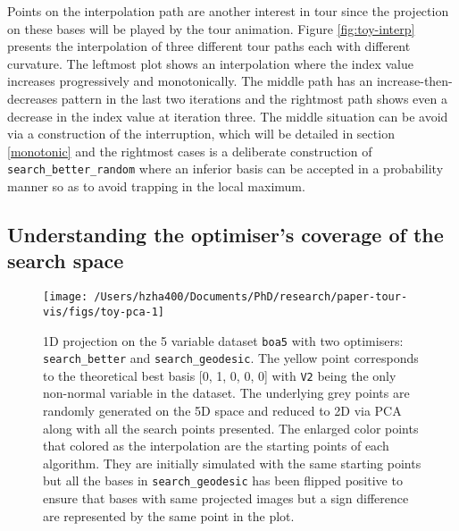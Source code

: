\documentclass[12pt]{article}
\begin{document}
Points on the interpolation path are another interest in tour since the projection on these bases will be played by the tour animation. Figure \ref{fig:toy-interp} presents the interpolation of three different tour paths each with different curvature. The leftmost plot shows an interpolation where the index value increases progressively and monotonically. The middle path has an increase-then-decreases pattern in the last two iterations and the rightmost path shows even a decrease in the index value at iteration three. The middle situation can be avoid via a construction of the interruption, which will be detailed in section \ref{monotonic} and the rightmost cases is a deliberate construction of \texttt{search\_better\_random} where an inferior basis can be accepted in a probability manner so as to avoid trapping in the local maximum.

\hypertarget{understanding-the-optimisers-coverage-of-the-search-space}{%
\subsection{Understanding the optimiser's coverage of the search space}\label{understanding-the-optimisers-coverage-of-the-search-space}}

\begin{figure}

{\centering \texttt{[image: /Users/hzha400/Documents/PhD/research/paper-tour-vis/figs/toy-pca-1]} 

}

\caption{1D projection on the 5 variable dataset \texttt{boa5} with two optimisers: \texttt{search\_better} and \texttt{search\_geodesic}. The yellow point corresponds to the theoretical best basis {[}0, 1, 0, 0, 0{]} with \texttt{V2} being the only non-normal variable in the dataset. The underlying grey points are randomly generated on the 5D space and reduced to 2D via PCA along with all the search points presented. The enlarged color points that colored as the interpolation are the starting points of each algorithm. They are initially simulated with the same starting points but all the bases in \texttt{search\_geodesic} has been flipped positive to ensure that bases with same projected images but a sign difference are represented by the same point in the plot.}\label{fig:toy-pca}
\end{figure}
\end{document}

